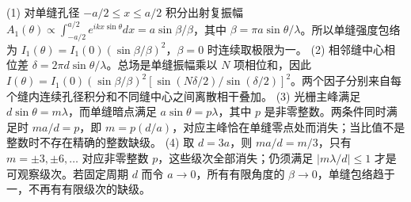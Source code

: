 (1) 对单缝孔径 \(-a/2\le x\le a/2\) 积分出射复振幅 \(A_1(\theta)\propto\int_{-a/2}^{a/2}e^{ikx\sin\theta}dx=a\sin\beta/\beta\)，其中 \(\beta=\pi a\sin\theta/\lambda\)。所以单缝强度包络为 \(I_1(\theta)=I_1(0)(\sin\beta/\beta)^2\)，\(\beta=0\) 时连续取极限为一。
(2) 相邻缝中心相位差 \(\delta=2\pi d\sin\theta/\lambda\)。总场是单缝振幅乘以 \(N\) 项相位和，因此 \(I(\theta)=I_1(0)(\sin\beta/\beta)^2[\sin(N\delta/2)/\sin(\delta/2)]^2\)。两个因子分别来自每个缝内连续孔径积分和不同缝中心之间离散相干叠加。
(3) 光栅主峰满足 \(d\sin\theta=m\lambda\)，而单缝暗点满足 \(a\sin\theta=p\lambda\)，其中 \(p\) 是非零整数。两条件同时满足时 \(ma/d=p\)，即 \(m=p(d/a)\)，对应主峰恰在单缝零点处而消失；当比值不是整数时不存在精确的整数缺级。
(4) 取 \(d=3a\)，则 \(ma/d=m/3\)，只有 \(m=\pm3,\pm6,\ldots\) 对应非零整数 \(p\)，这些级次全部消失；仍须满足 \(|m\lambda/d|\le1\) 才是可观察级次。若固定周期 \(d\) 而令 \(a\to0\)，所有有限角度的 \(\beta\to0\)，单缝包络趋于一，不再有有限级次的缺级。
